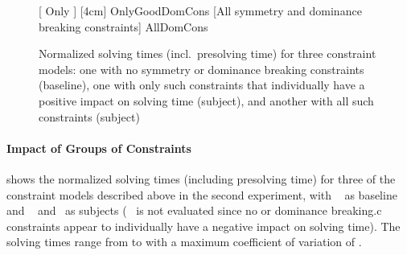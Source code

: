 
\begin{figure}
  \centering%

                      [%
                        Only
                      ]%
                      [4cm]%
                      {OnlyGoodDomCons}%
  \hfill%
                      [All symmetry and dominance breaking constraints]%
                      {AllDomCons}%

  \caption[%
            Plot for evaluating the impact on solving time made by different
            combinations of symmetry and dominance breaking constraints%
          ]%
          {%
            Normalized solving times (incl.\ presolving time) for three
            constraint models: one with no symmetry or dominance breaking
            constraints (baseline), one with only such constraints that
            individually have a positive impact on solving time (subject), and
            another with all such constraints (subject)%
          }
\end{figure}


\paragraph{Impact of Groups of Constraints}

 shows the normalized solving
times (including \gls{presolving} time) for three of the \glspl{constraint
  model} described above in the second experiment, with ~ as \gls{baseline} and ~ and~ as
\glspl{subject} (~ is
not evaluated since no  or \gls{dominance
  breaking.c} \glspl{constraint} appear to individually have a negative impact
on solving time).
%
The solving times range from
\printMinSolvingTime{
  \SolvTechEnableOnlyGoodDomConsPrePlusSolvingTimeSpeedupNonePrePlusSolvingTimeAvgMin,
  \SolvTechEnableOnlyGoodDomConsPrePlusSolvingTimeSpeedupPrePlusSolvingTimeAvgMin,
  \SolvTechDisableAllDomConsPrePlusSolvingTimeSpeedupPrePlusSolvingTimeAvgMin
} to
\printMaxSolvingTime{
  \SolvTechEnableOnlyGoodDomConsPrePlusSolvingTimeSpeedupNonePrePlusSolvingTimeAvgMax,
  \SolvTechEnableOnlyGoodDomConsPrePlusSolvingTimeSpeedupPrePlusSolvingTimeAvgMax,
  \SolvTechDisableAllDomConsPrePlusSolvingTimeSpeedupPrePlusSolvingTimeAvgMax
} with a maximum coefficient of variation of
\numMaxOf{
  \SolvTechEnableOnlyGoodDomConsPrePlusSolvingTimeSpeedupNonePrePlusSolvingTimeCvMax,
  \SolvTechEnableOnlyGoodDomConsPrePlusSolvingTimeSpeedupPrePlusSolvingTimeCvMax,
  \SolvTechDisableAllDomConsPrePlusSolvingTimeSpeedupPrePlusSolvingTimeCvMax
}.

